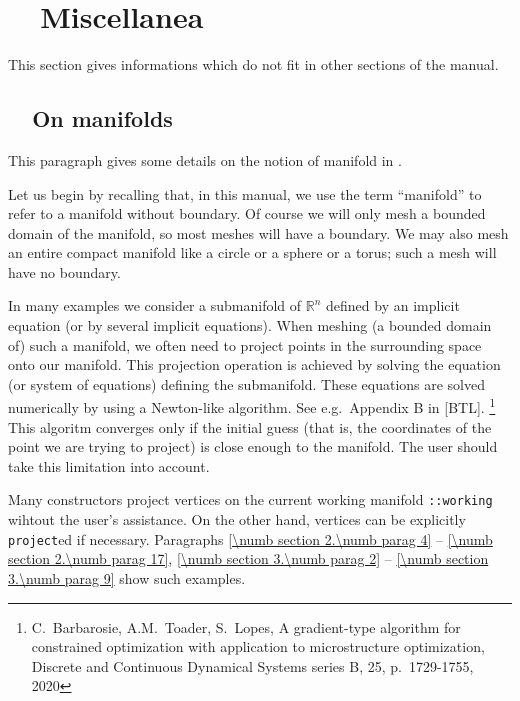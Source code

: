 
\chapter{~~Miscellanea}\label{\numb section 8}

This section gives informations which do not fit in other sections of the manual.


\section{~~On manifolds}\label{\numb section 8.\numb parag 1}

This paragraph gives some details on the notion of manifold in \maniFEM.

Let us begin by recalling that, in this manual, we use the term ``manifold'' to refer to
a manifold without boundary.
Of course we will only mesh a bounded domain of the manifold, so most meshes will have a boundary.
We may also mesh an entire compact manifold like a circle or a sphere or a torus;
such a mesh will have no boundary.

In many examples we consider a submanifold of $ \mathbb{R}^n $ defined by an implicit equation
(or by several implicit equations).
When meshing (a bounded domain of) such a manifold, we often need to project points in
the surrounding space onto our manifold. This projection operation is achieved by solving
the equation (or system of equations) defining the submanifold.
These equations are solved numerically by using a Newton-like algorithm.
See e.g.\ Appendix B in [BTL].%
\footnote {{} C.~Barbarosie, A.M.~Toader, S.~Lopes, A gradient-type algorithm for constrained
optimization with application to microstructure optimization, Discrete and Continuous Dynamical
Systems series B, 25, p.\ 1729-1755, 2020}
This algoritm converges only if the initial guess (that is, the coordinates of the point we are
trying to project) is close enough to the manifold.
The user should take this limitation into account.

Many {\small\tt{}} constructors project vertices on the current working manifold
{\small\tt{}::working} wihtout the user's assistance.
On the other hand, vertices can be explicitly {\small\tt project}ed if necessary.
Paragraphs \ref{\numb section 2.\numb parag 4} -- \ref{\numb section 2.\numb parag 17},
\ref{\numb section 3.\numb parag 2} -- \ref{\numb section 3.\numb parag 9} show such examples.


